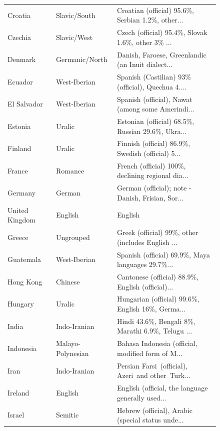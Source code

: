\documentclass[a4paper,10pt]{article}
\begin{document}
\begin{figure}
\begin{center}
\begin{tabularx}{\textwidth}{llX}
Croatia             &       Slavic/South &  Croatian (official) 95.6\%, Serbian 1.2\%, other... \\
Czechia             &        Slavic/West &  Czech (official) 95.4\%, Slovak 1.6\%, other 3\% ... \\
Denmark             &     Germanic/North &  Danish, Faroese, Greenlandic (an Inuit dialect... \\
Ecuador             &       West-Iberian &  Spanish (Castilian) 93\% (official), Quechua 4.... \\
El Salvador         &       West-Iberian &  Spanish (official), Nawat (among some Amerindi... \\
Estonia             &             Uralic &  Estonian (official) 68.5\%, Russian 29.6\%, Ukra... \\
Finland             &             Uralic &  Finnish (official) 86.9\%, Swedish (official) 5... \\
France              &            Romance &  French (official) 100\%, declining regional dia... \\
Germany             &             German &  German (official); note - Danish, Frisian, Sor... \\
United Kingdom      &            English &                                            English \\
Greece              &          Ungrouped &  Greek (official) 99\%, other (includes English ... \\
Guatemala           &       West-Iberian &  Spanish (official) 69.9\%, Maya languages 29.7\%... \\
Hong Kong           &            Chinese &  Cantonese (official) 88.9\%, English (official)... \\
Hungary             &             Uralic &  Hungarian (official) 99.6\%, English 16\%, Germa... \\
India               &       Indo-Iranian &  Hindi 43.6\%, Bengali 8\%, Marathi 6.9\%, Telugu ... \\
Indonesia           &  Malayo-Polynesian &  Bahasa Indonesia (official, modified form of M... \\
Iran                &       Indo-Iranian &  Persian Farsi (official), Azeri and other Turk... \\
Ireland             &            English &  English (official, the language generally used... \\
Israel              &            Semitic &  Hebrew (official), Arabic (special status unde... \\

\end{tabularx}
\end{center}
\end{figure}
\end{document}
